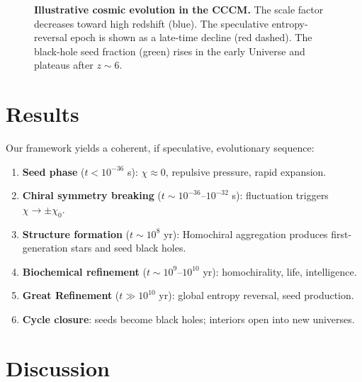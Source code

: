 \documentclass[a4paper,11pt]{article}
\newcommand{\CCCM}{CCCM}
\begin{document}
\begin{figure}[htbp]
\centering
{}
\caption{\textbf{Illustrative cosmic evolution in the \CCCM.} The scale factor decreases toward high redshift (blue). The speculative entropy-reversal epoch is shown as a late-time decline (red dashed). The black-hole seed fraction (green) rises in the early Universe and plateaus after $z \sim 6$.}
\label{fig:evolution}
\end{figure}

\section{Results}
\label{sec:results}

Our framework yields a coherent, if speculative, evolutionary sequence:
\begin{enumerate}[label=(\arabic*)]
    \item \textbf{Seed phase} ($t < 10^{-36}$ s): $\chi \approx 0$, repulsive pressure, rapid expansion.
    \item \textbf{Chiral symmetry breaking} ($t \sim 10^{-36}$--$10^{-32}$ s): fluctuation triggers $\chi \to \pm \chi_0$.
    \item \textbf{Structure formation} ($t \sim 10^8$ yr): Homochiral aggregation produces first-generation stars and seed black holes.
    \item \textbf{Biochemical refinement} ($t \sim 10^9$--$10^{10}$ yr): homochirality, life, intelligence.
    \item \textbf{Great Refinement} ($t \gg 10^{10}$ yr): global entropy reversal, seed production.
    \item \textbf{Cycle closure}: seeds become black holes; interiors open into new universes.
\end{enumerate}

\section{Discussion}
\label{sec:discussion}
\end{document}
